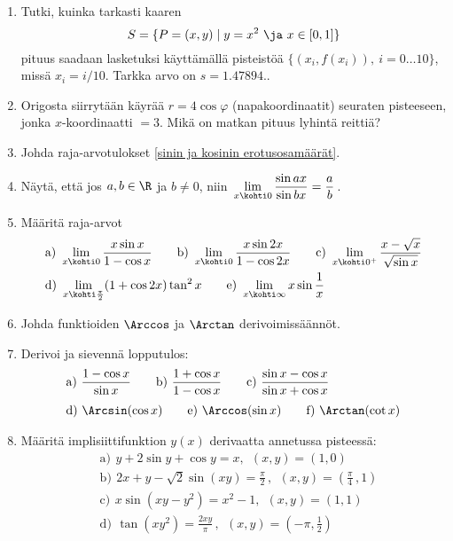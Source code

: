 \Harj
\begin{enumerate}

\item \label{H-V-4: numeerinen kaarenpituus}
Tutki, kuinka tarkasti kaaren
\[
S=\{P=(x,y) \mid y=x^2\ \ja\ x\in[0,1]\}
\]
pituus saadaan lasketuksi käyttämällä pisteistöä $\{(x_i,f(x_i)),\ i=0 \ldots 10\}$, missä 
$x_i=i/10$. Tarkka arvo on $s=1.47894..$

\item
Origosta siirrytään käyrää $r=4\cos\varphi$ (napakoordinaatit) seuraten pisteeseen, jonka
$x$-koordinaatti $=3$. Mikä on matkan pituus lyhintä reittiä?

\item \label{H-V-4: sinin ja kosinin erotusosamäärät}
Johda raja-arvotulokset \eqref{sinin ja kosinin erotusosamäärät}.

\item
Näytä, että jos $a,b\in\R$ ja $b \neq 0$, niin 
$\,\displaystyle{\lim_{x \kohti 0}\frac{\sin ax}{\sin bx}=\frac{a}{b}}\,$.

\item
Määritä raja-arvot
\begin{align*}
&\text{a)}\ \lim_{x \kohti 0} \frac{x\sin x}{1-\cos x} \qquad
 \text{b)}\ \lim_{x \kohti 0} \frac{x\sin 2x}{1-\cos 2x} \qquad
 \text{c)}\ \lim_{x \kohti 0^+} \frac{x-\sqrt{x}}{\sqrt{\sin x}} \\
&\text{d)}\ \lim_{x\kohti\frac{\pi}{2}}(1+\cos 2x)\tan^2 x \qquad
 \text{e)}\ \lim_{x\kohti\infty} x\sin\frac{1}{x}
\end{align*}

\item \label{H-V-4: Arccos ja Arctan}
Johda funktioiden $\Arccos$ ja $\Arctan$ derivoimissäännöt.

\item
Derivoi ja sievennä lopputulos:
\begin{align*}
&\text{a)}\ \frac{1-\cos x}{\sin x} \qquad
 \text{b)}\ \frac{1+\cos x}{1-\cos x} \qquad
 \text{c)}\ \frac{\sin x-\cos x}{\sin x+\cos x} \\[1mm]
&\text{d)}\ \Arcsin(\cos x) \qquad
 \text{e)}\ \Arccos(\sin x) \qquad
 \text{f)}\ \Arctan(\cot x)
\end{align*} 

\item
Määritä implisiittifunktion $y(x)$ derivaatta annetussa pisteessä:
\begin{align*}
&\text{a)}\,\ y+2\sin y+\cos y=x,\ \ (x,y)=(1,0) \\
&\text{b)}\,\ 2x+y-\sqrt{2}\sin(xy)=\frac{\pi}{2}\,,\ \ (x,y)=\left(\frac{\pi}{4}\,,1\right) \\
&\text{c)}\,\ x\sin(xy-y^2)=x^2-1,\ \ (x,y)=(1,1) \\
&\text{d)}\,\ \tan(xy^2)=\frac{2xy}{\pi}\,,\ \ (x,y)=\left(-\pi,\frac{1}{2}\right)
\end{align*}


\end{enumerate}
